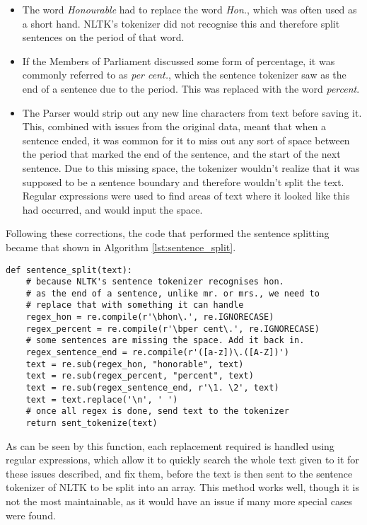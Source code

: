 \begin{itemize}
	\item The word \emph{Honourable} had to replace the word \emph{Hon.}, which was often used as a short hand. NLTK's tokenizer did not recognise this and therefore split sentences on the period of that word.
	\item If the Members of Parliament discussed some form of percentage, it was commonly referred to as \emph{per cent.}, which the sentence tokenizer saw as the end of a sentence due to the period. This was replaced with the word \emph{percent}.
	\item The Parser would strip out any new line characters from text before saving it. This, combined with issues from the original data, meant that when a sentence ended, it was common for it to miss out any sort of space between the period that marked the end of the sentence, and the start of the next sentence. Due to this missing space, the tokenizer wouldn't realize that it was supposed to be a sentence boundary and therefore wouldn't split the text. Regular expressions were used to find areas of text where it looked like this had occurred, and would input the space.
\end{itemize}
 
Following these corrections, the code that performed the sentence splitting became that shown in Algorithm \ref{lst:sentence_split}.

\begin{lstlisting}[float=ht,
				   caption={Sentence Splitting method, with included regular expressions},
				   label={lst:sentence_split}]
def sentence_split(text):
	# because NLTK's sentence tokenizer recognises hon.
	# as the end of a sentence, unlike mr. or mrs., we need to
    # replace that with something it can handle    
    regex_hon = re.compile(r'\bhon\.', re.IGNORECASE)
    regex_percent = re.compile(r'\bper cent\.', re.IGNORECASE)
    # some sentences are missing the space. Add it back in.
    regex_sentence_end = re.compile(r'([a-z])\.([A-Z])') 
    text = re.sub(regex_hon, "honorable", text)
    text = re.sub(regex_percent, "percent", text)
    text = re.sub(regex_sentence_end, r'\1. \2', text)
    text = text.replace('\n', ' ')
    # once all regex is done, send text to the tokenizer
    return sent_tokenize(text)
\end{lstlisting}

As can be seen by this function, each replacement required is handled using regular expressions, which allow it to quickly search the whole text given to it for these issues described, and fix them, before the text is then sent to the sentence tokenizer of NLTK to be split into an array. This method works well, though it is not the most maintainable, as it would have an issue if many more special cases were found.

